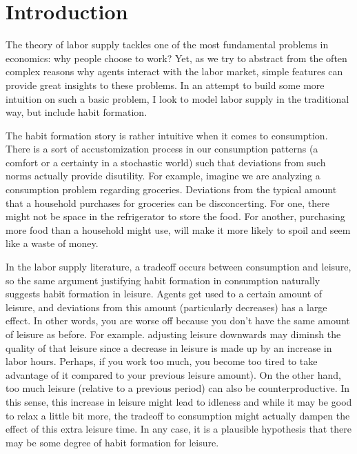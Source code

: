 \documentclass[ProjectMMD]{subfiles}
\begin{document}
{\titlepagefinish}

\hypertarget{Introduction}{}
\section{Introduction}\label{sec:intro}

The theory of labor supply tackles one of the most fundamental problems in economics: why people choose to work? Yet, as we try to abstract from the often complex reasons why agents interact with the labor market, simple features can provide great insights to these problems. In an attempt to build some more intuition on such a basic problem, I look to model labor supply in the traditional way, but include habit formation.

The habit formation story is rather intuitive when it comes to consumption. There is a sort of accustomization process in our consumption patterns (a comfort or a certainty in a stochastic world) such that deviations from such norms actually provide disutility. For example, imagine we are analyzing a consumption problem regarding groceries. Deviations from the typical amount that a household purchases for groceries can be disconcerting. For one, there might not be space in the refrigerator to store the food. For another, purchasing more food than a household might use, will make it more likely to spoil and seem like a waste of money. 

In the labor supply literature, a tradeoff occurs between consumption and leisure, so the same argument justifying habit formation in consumption naturally suggests habit formation in leisure. Agents get used to a certain amount of leisure, and deviations from this amount (particularly decreases) has a large effect. In other words, you are worse off because you don't have the same amount of leisure as before. For example. adjusting leisure downwards may diminsh the quality of that leisure since a decrease in leisure is made up by an increase in labor hours. Perhaps, if you work too much, you become too tired to take advantage of it compared to your previous leisure amount). On the other hand, too much leisure (relative to a previous period) can also be counterproductive. In this sense, this increase in leisure might lead to idleness and while it may be good to relax a little bit more, the tradeoff to consumption might actually dampen the effect of this extra leisure time. In any case, it is a plausible hypothesis that there may be some degree of habit formation for leisure.
\end{document}
